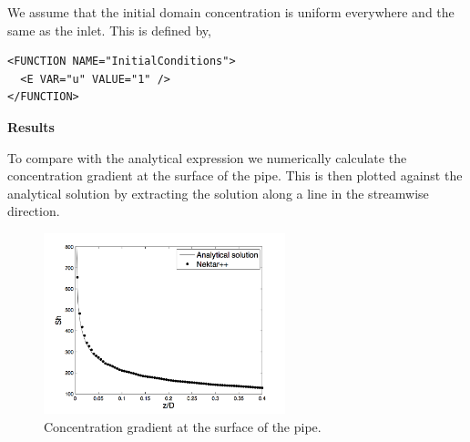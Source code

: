 We assume that the initial domain concentration is uniform everywhere and the same as the inlet. This is defined by,

\begin{lstlisting}[style=XMLStyle]
<FUNCTION NAME="InitialConditions">
  <E VAR="u" VALUE="1" />
</FUNCTION>
\end{lstlisting}

\textbf{Results}

To compare with the analytical expression we numerically calculate the concentration gradient at the surface of the pipe. 
This is then plotted against the analytical solution by extracting the solution along a line in the streamwise direction.

\begin{figure}[h!]
\begin{center}
\includegraphics[width=7cm]{Figures/graetz-nusselt}
\caption{Concentration gradient at the surface of the pipe.}
\end{center}
\end{figure}



